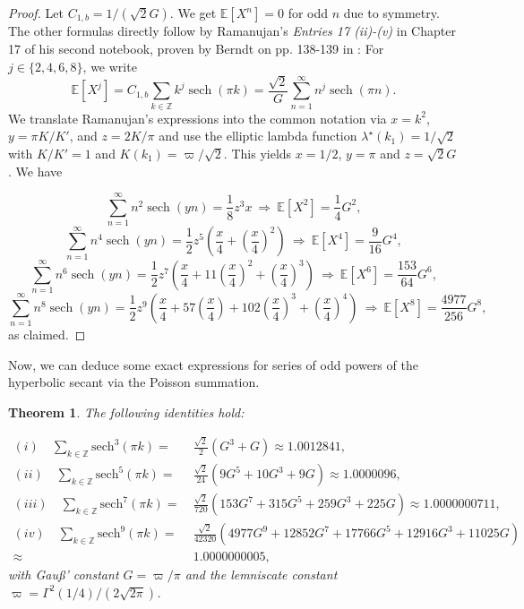 \documentclass[12pt]{amsart}
\newtheorem{theorem}{Theorem}[section]
\theoremstyle{definition}
\theoremstyle{remark}
\numberwithin{equation}{section}
\newcommand{\1}{\mathbbm{1}}
\begin{document}
\begin{proof}
Let $C_{1,b} = 1/(\sqrt{2}G)$. We get $\mathbb{E}[X^n] = 0$ for odd $n$ due to symmetry. The other formulas directly follow by Ramanujan's \textit{Entries 17 (ii)-(v)} in Chapter 17 of his second notebook, proven by Berndt on pp. 138-139 in \cite{ramanujan_1991}: For $j\in \{2,4,6,8\}$, we write
$$
\mathbb{E}\left[X^{j}\right] = C_{1,b} \sum_{k\in\mathbb{Z}} k^{j} \operatorname{sech}(\pi k) = \frac{\sqrt{2}}{G} \sum_{n=1}^\infty n^{j} \operatorname{sech}(\pi n).
$$
We translate Ramanujan's expressions into the common notation via $x = k^2$, $y = \pi K/K'$, and $z=2 K/\pi$ and use the elliptic lambda function $\lambda^\star(k_1) = 1/\sqrt{2}$ with $K/K'=1$ and $K(k_1)=\varpi/\sqrt{2}$. This yields $x=1/2$, $y=\pi$ and $z=\sqrt{2}G$. We have

$$
\sum_{n=1}^\infty n^{2} \operatorname{sech}(y n) = \frac{1}{8} z^3 x
\ \Rightarrow \
\mathbb{E}\left[X^2\right] = \frac{1}{4} G^2,
$$
$$
\sum_{n=1}^\infty n^{4} \operatorname{sech}(y n) = \frac{1}{2} z^5 \left(\frac{x}{4} + \left(\frac{x}{4} \right)^2 \right)
\ \Rightarrow \
\mathbb{E}\left[X^4\right] = \frac{9}{16} G^4,
$$
$$
\sum_{n=1}^\infty n^{6} \operatorname{sech}(y n) = \frac{1}{2} z^7 \left(\frac{x}{4} + 11\left(\frac{x}{4}\right)^2 + \left(\frac{x}{4} \right)^3 \right)
\ \Rightarrow \
\mathbb{E}\left[X^6\right] = \frac{153}{64} G^6,
$$
$$
\sum_{n=1}^\infty n^{8} \operatorname{sech}(y n) = \frac{1}{2} z^9 \left(\frac{x}{4} + 57\left(\frac{x}{4}\right) + 102 \left(\frac{x}{4} \right)^3 + \left(\frac{x}{4} \right)^4 \right)
\ \Rightarrow \
\mathbb{E}\left[X^8\right] = \frac{4977}{256} G^8,
$$
\vspace{0.7cm}
as claimed.
\end{proof}

Now, we can deduce some exact expressions for series of odd powers of the hyperbolic secant via the Poisson summation.

\begin{theorem}
The following identities hold:

\begin{align*}
(i) \quad \sum_{k\in\mathbb{Z}} \mathrm{sech}^3 (\pi k) =&\ \frac{\sqrt{2}}{2}\left(G^3 + G\right) \approx 1.0012841,\\
(ii) \quad \sum_{k \in \mathbb{Z}} \mathrm{sech}^5(\pi k) =&\ \frac{\sqrt{2}}{24}(9 G^5 + 10 G^3 + 9 G) \approx 1.0000096,\\
(iii) \quad \sum_{k \in \mathbb{Z}} \mathrm{sech}^7(\pi k) =&\ \frac{\sqrt{2}}{720}\left(153 G^7 + 315 G^5 + 259 G^3 + 225 G\right) \approx 1.0000000711,\\
(iv) \quad \sum_{k \in \mathbb{Z}} \mathrm{sech}^9(\pi k) =&\ \frac{\sqrt{2}}{42320}\left(4977 G^9 + 12852 G^7 + 17766 G^5 + 12916 G^3 + 11025 G\right)\\
\approx&\ 1.0000000005,
\end{align*}
with Gau\ss' constant $G = \varpi/\pi$ and the lemniscate constant $\varpi = \Gamma^2(1/4)/(2\sqrt{2\pi})$.
\end{theorem}
\end{document}
